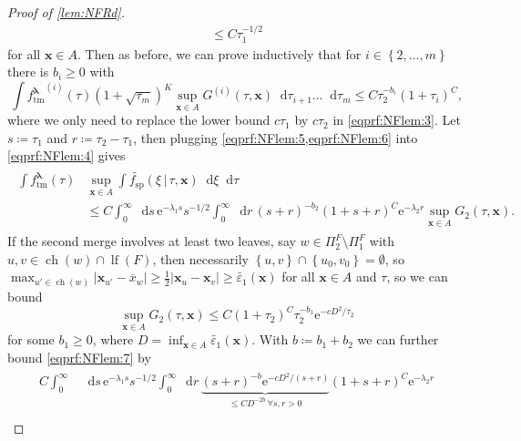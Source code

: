 \documentclass[reqno,draft]{amsart}
\numberwithin{equation}{section}
\theoremstyle{plain}
\theoremstyle{remark}
\newcommand*\diff{\mathop{}\!\mathrm{d}}
\newcommand{\e}{\mathrm{e}}
\DeclareMathOperator{\ch}{ch}
\newcommand{\fpart}{\Pi} %
\DeclareMathOperator{\lf}{lf}
\newcommand{\rfy}[1]{\widetilde{{#1}}} %
\newcommand{\ftm}{f_\mathrm{tm}^{\boldsymbol \lambda}}
\newcommand{\fsp}{f_\mathrm{sp}}
\newcommand{\interp}{\overline{x}} %
\begin{document}
\begin{proof}[Proof of \cref{lem:NFRd}]
\begin{align}
    \le C \tau_1^{-1 / 2}
    \end{align}
    for all $\boldsymbol x\in A$. Then as before, we can prove inductively that for $i\in \left\{ 2, \ldots ,m \right\} $ there is $b_i \ge 0$ with
    \begin{equation}\label{eqprf:NFlem:6}
        \int {\ftm}^{(i)}(\tau) (1+\sqrt{\tau_m} )^K \sup_{\boldsymbol x \in A} G^{(i)}(\tau,\boldsymbol x) \diff \tau_{i+1}\ldots \diff \tau_m \le C \tau_{2}^{-b_i} (1 + \tau_i)^C,
    \end{equation}
    where we only need to replace the lower bound $c\tau_1$ by $c\tau_2$ in \cref{eqprf:NFlem:3}. Let $s\coloneqq \tau_1$ and $r\coloneqq \tau_2-\tau_1$, then plugging \cref{eqprf:NFlem:5,eqprf:NFlem:6} into \cref{eqprf:NFlem:4} gives
    \begin{align}\begin{split}\label{eqprf:NFlem:7}
        \int \ftm(\tau) & \sup_{\boldsymbol x\in A} \int \rfy{\fsp}(\xi \,\vert\,\tau,\boldsymbol x) \diff \xi \diff \tau\\
        &\le C \int_0^\infty \diff s\, \e^{-\lambda_1 s}s^{-1 / 2} \int_0^\infty \diff r\, (s+r)^{-b_2}(1+s+r)^C \e^{-\lambda_2 r} \sup_{\boldsymbol x\in A} G_2(\tau,\boldsymbol x).
    \end{split}\end{align}
    If the second merge involves at least two leaves, say $w\in \fpart^F_2\setminus \fpart^F_1$ with $u,v\in \ch(w)\cap \lf(F)$, then necessarily $\left\{ u,v \right\} \cap \left\{ u_0,v_0 \right\} = \emptyset $, so $\max_{u' \in \ch(w)}|\boldsymbol x_{u'}-\interp_{w}| \ge \frac{1}{2}|\boldsymbol x_u-\boldsymbol x_v| \ge \rfy{\varepsilon_1}(\boldsymbol x)$ for all $\boldsymbol x\in A$ and $\tau$, so we can bound \[
        \sup_{\boldsymbol x\in A} G_2(\tau,\boldsymbol x) \le C (1+\tau_2)^C \tau_2^{-b_1} \e^{-cD^2 / \tau_2}
    \] for some $b_1 \ge 0$, where $D = \inf_{\boldsymbol x\in A}\rfy{\varepsilon_1}(\boldsymbol x)$. With $b\coloneqq b_1+b_2$ we can further bound \cref{eqprf:NFlem:7} by
    \begin{align}\begin{split}\label{eqprf:NFlem:8}
        C \int_0^\infty & \diff s\, \e^{-\lambda_1 s} s^{-1 / 2} \int_0^\infty \diff r\, \underbrace{(s+r)^{-b} \e^{-cD^2 / (s+r)}}_{\le C D^{-2b} \, \forall s,r > 0} (1+s+r)^C \e^{-\lambda_2 r}\\[3pt]

\end{split}
\end{align}
\end{proof}
\end{document}
